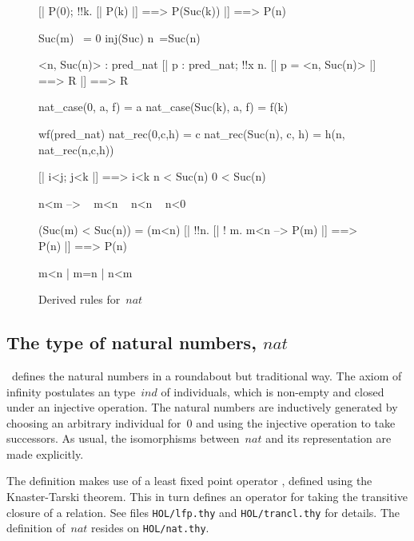 \begin{figure} \underscoreon
\begin{ttbox}
     [| P(0); !!k. [| P(k) |] ==> P(Suc(k)) |]  ==> P(n)

   Suc(m) ~= 0
        inj(Suc)
    n~=Suc(n)

      <n, Suc(n)> : pred_nat
    [| p : pred_nat;  !!x n. [| p = <n, Suc(n)> |] ==> R |] ==> R

     nat_case(0, a, f) = a
   nat_case(Suc(k), a, f) = f(k)

    wf(pred_nat)
      nat_rec(0,c,h) = c
    nat_rec(Suc(n), c, h) = h(n, nat_rec(n,c,h))

     [| i<j;  j<k |] ==> i<k
          n < Suc(n)
  0 < Suc(n)

   n<m --> ~ m<n 
  ~ n<n
      ~ n<0

    (Suc(m) < Suc(n)) = (m<n)
    [| !!n. [| ! m. m<n --> P(m) |] ==> P(n) |]  ==>  P(n)

    m<n | m=n | n<m
\end{ttbox}
\caption{Derived rules for~$nat$} \label{hol-nat2}
\end{figure}


\subsection{The type of natural numbers, $nat$}
\HOL\ defines the natural numbers in a roundabout but traditional way.
The axiom of infinity postulates an type~$ind$ of individuals, which is
non-empty and closed under an injective operation.  The natural numbers are
inductively generated by choosing an arbitrary individual for~0 and using
the injective operation to take successors.  As usual, the isomorphisms
between~$nat$ and its representation are made explicitly.

The definition makes use of a least fixed point operator ,
defined using the Knaster-Tarski theorem.  This in turn defines an operator
 for taking the transitive closure of a relation.  See
files {\tt HOL/lfp.thy} and {\tt HOL/trancl.thy} for
details.  The definition of~$nat$ resides on {\tt HOL/nat.thy}.  


